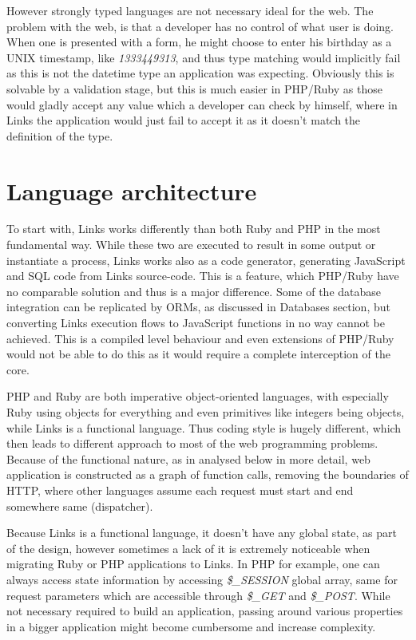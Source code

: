 However strongly typed languages are not necessary ideal for the web. The problem with the web, is that a developer has no control of what user is doing. When one is presented with a form, he might choose to enter his birthday as a UNIX timestamp, like \textit{1333449313}, and thus type matching would implicitly fail as this is not the datetime type an application was expecting. Obviously this is solvable by a validation stage, but this is much easier in PHP/Ruby as those would gladly accept any value which a developer can check by himself, where in Links the application would just fail to accept it as it doesn't match the definition of the type.

\section{Language architecture}

To start with, Links works differently than both Ruby and PHP in the most fundamental way. While these two are executed to result in some output or instantiate a process, Links works also as a code generator, generating JavaScript and SQL code from Links source-code. This is a feature, which PHP/Ruby have no comparable solution and thus is a major difference. Some of the database integration can be replicated by ORMs, as discussed in Databases section, but converting Links execution flows to JavaScript functions in no way cannot be achieved. This is a compiled level behaviour and even extensions of PHP/Ruby would not be able to do this as it would require a complete interception of the core. 

PHP and Ruby are both imperative object-oriented languages, with especially Ruby using objects for everything and even primitives like integers being objects, while Links is a functional language. Thus coding style is hugely different, which then leads to different approach to most of the web programming problems. Because of the functional nature, as in analysed below in more detail, web application is constructed as a graph of function calls, removing the boundaries of HTTP, where other languages assume each request must start and end somewhere same (dispatcher).

Because Links is a functional language, it doesn't have any global state, as part of the design, however sometimes a lack of it is extremely noticeable when migrating Ruby or PHP applications to Links. In PHP for example, one can always access state information by accessing \textit{\$\_SESSION} global array, same for request parameters which are accessible through \textit{\$\_GET} and \textit{\$\_POST}. While not necessary required to build an application, passing around various properties in a bigger application might become cumbersome and increase complexity. 

